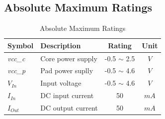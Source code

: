 \subsection{Absolute Maximum Ratings}
\begin{table}[ht]
 \caption[Absolute Maximum Ratings]{Absolute Maximum Ratings \cite{faraday}}
 \label{tab:elect_rec}
\centering\begin{tabular}{|l|l|c|c|} \hline
Symbol & Description & Rating & Unit \\ \hline
\textit{vcc\_c} & Core power supply & -0.5 $\sim$ 2.5 & $V$ \\ \hline
\textit{vcc\_p} & Pad power suplly & -0.5 $\sim$ 4.6 & $V$ \\ \hline
$V_{In}$ & Input voltage &  -0.5 $\sim$ 4.6 & $V$ \\ \hline
$I_{In}$ & DC input current & 50 & $mA$ \\ \hline
$I_{Out}$ & DC output current & 50 & $mA$ \\ \hline
 \end{tabular}
\end{table}
